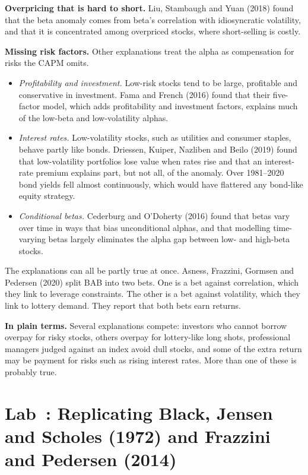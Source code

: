 \textbf{Overpricing that is hard to short.} Liu, Stambaugh and Yuan (2018) found that the beta anomaly comes from beta's correlation with idiosyncratic volatility, and that it is concentrated among overpriced stocks, where short-selling is costly.

\textbf{Missing risk factors.} Other explanations treat the alpha as compensation for risks the CAPM omits.

\begin{itemize}
  \item \emph{Profitability and investment.} Low-risk stocks tend to be large, profitable and conservative in investment. Fama and French (2016) found that their five-factor model, which adds profitability and investment factors, explains much of the low-beta and low-volatility alphas.
  \item \emph{Interest rates.} Low-volatility stocks, such as utilities and consumer staples, behave partly like bonds. Driessen, Kuiper, Nazliben and Beilo (2019) found that low-volatility portfolios lose value when rates rise and that an interest-rate premium explains part, but not all, of the anomaly. Over 1981--2020 bond yields fell almost continuously, which would have flattered any bond-like equity strategy.
  \item \emph{Conditional betas.} Cederburg and O'Doherty (2016) found that betas vary over time in ways that bias unconditional alphas, and that modelling time-varying betas largely eliminates the alpha gap between low- and high-beta stocks.
\end{itemize}

The explanations can all be partly true at once. Asness, Frazzini, Gormsen and Pedersen (2020) split BAB into two bets. One is a bet against correlation, which they link to leverage constraints. The other is a bet against volatility, which they link to lottery demand. They report that both bets earn returns.

\noindent\textbf{In plain terms.} Several explanations compete: investors who cannot borrow overpay for risky stocks, others overpay for lottery-like long shots, professional managers judged against an index avoid dull stocks, and some of the extra return may be payment for risks such as rising interest rates. More than one of these is probably true.

\section{Lab~\thechapter: Replicating Black, Jensen and Scholes (1972) and Frazzini and Pedersen (2014)}
\label{sec:18-lab}

